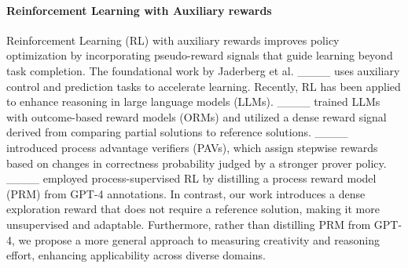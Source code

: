 \paragraph{Reinforcement Learning with Auxiliary rewards}

Reinforcement Learning (RL) with auxiliary rewards improves policy optimization by incorporating pseudo-reward signals that guide learning beyond task completion. 
The foundational work by Jaderberg et al. ____ uses auxiliary control and prediction tasks to accelerate learning. Recently, RL has been applied to enhance reasoning in large language models (LLMs). 
____ trained LLMs with outcome-based reward models (ORMs) and utilized a dense reward signal derived from comparing partial solutions to reference solutions.
____ introduced process advantage verifiers (PAVs), which assign stepwise rewards based on changes in correctness probability judged by a stronger prover policy.
____ employed process-supervised RL by distilling a process reward model (PRM) from GPT-4 annotations. In contrast, our work introduces a dense exploration reward that does not require a reference solution, making it more unsupervised and adaptable. Furthermore, rather than distilling PRM from GPT-4, we propose a more general approach to measuring creativity and reasoning effort, enhancing applicability across diverse domains.
